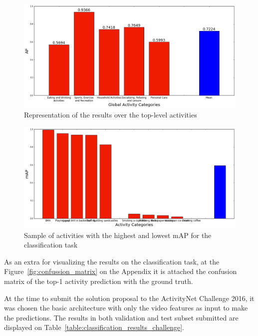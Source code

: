 \begin{figure}[H]
\begin{center}
\includegraphics[width=1\linewidth]{img/results/top_activities_classification_ap}
\end{center}
\caption{Representation of the results over the top-level activities}
\label{fig:top_level_classification_ap}
\end{figure}


\begin{figure}[H]
\begin{center}
\includegraphics[width=1\linewidth]{img/results/high_low_map_classification}
\end{center}
\caption{Sample of activities with the highest and lowest mAP for the classification task}
\label{fig:map_by_activity_classification}
\end{figure}

As an extra for visualizing the results on the classification task, at the Figure~\ref{fig:confussion_matrix} on the Appendix it is attached the confusion matrix of the top-1 activity prediction with the ground truth.

At the time to submit the solution proposal to the ActivityNet Challenge 2016, it was chosen the basic architecture with only the video features as input to make the predictions. The results in both validation and test subset submitted are displayed on Table~\ref{table:classification_results_challenge}.

